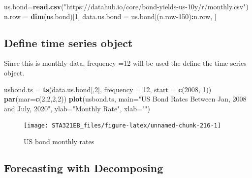 \documentclass[
]{book}
\newenvironment{Shaded}{\begin{snugshade}}{\end{snugshade}}
\newcommand{\AttributeTok}[1]{\textcolor[rgb]{0.13,0.29,0.53}{#1}}
\newcommand{\DecValTok}[1]{\textcolor[rgb]{0.00,0.00,0.81}{#1}}
\newcommand{\FunctionTok}[1]{\textcolor[rgb]{0.13,0.29,0.53}{\textbf{#1}}}
\newcommand{\NormalTok}[1]{#1}
\newcommand{\OtherTok}[1]{\textcolor[rgb]{0.56,0.35,0.01}{#1}}
\newcommand{\SpecialCharTok}[1]{\textcolor[rgb]{0.81,0.36,0.00}{\textbf{#1}}}
\newcommand{\StringTok}[1]{\textcolor[rgb]{0.31,0.60,0.02}{#1}}
\begin{document}
\begin{Shaded}
\begin{Highlighting}[]
\NormalTok{us.bond}\OtherTok{=}\FunctionTok{read.csv}\NormalTok{(}\StringTok{"https://datahub.io/core/bond{-}yields{-}us{-}10y/r/monthly.csv"}\NormalTok{)}
\NormalTok{n.row }\OtherTok{=} \FunctionTok{dim}\NormalTok{(us.bond)[}\DecValTok{1}\NormalTok{]}
\NormalTok{data.us.bond }\OtherTok{=}\NormalTok{ us.bond[(n.row}\DecValTok{{-}150}\NormalTok{)}\SpecialCharTok{:}\NormalTok{n.row, ]}
\end{Highlighting}
\end{Shaded}

\hypertarget{define-time-series-object}{%
\subsection{Define time series object}\label{define-time-series-object}}

Since this is monthly data, frequency =12 will be used the define the time series object.

\begin{Shaded}
\begin{Highlighting}[]
\NormalTok{usbond.ts }\OtherTok{=} \FunctionTok{ts}\NormalTok{(data.us.bond[,}\DecValTok{2}\NormalTok{], }\AttributeTok{frequency =} \DecValTok{12}\NormalTok{, }\AttributeTok{start =} \FunctionTok{c}\NormalTok{(}\DecValTok{2008}\NormalTok{, }\DecValTok{1}\NormalTok{))}
\FunctionTok{par}\NormalTok{(}\AttributeTok{mar=}\FunctionTok{c}\NormalTok{(}\DecValTok{2}\NormalTok{,}\DecValTok{2}\NormalTok{,}\DecValTok{2}\NormalTok{,}\DecValTok{2}\NormalTok{))}
\FunctionTok{plot}\NormalTok{(usbond.ts, }\AttributeTok{main=}\StringTok{"US Bond Rates Between Jan, 2008 and July, 2020"}\NormalTok{, }\AttributeTok{ylab=}\StringTok{"Monthly Rate"}\NormalTok{, }\AttributeTok{xlab=}\StringTok{""}\NormalTok{)}
\end{Highlighting}
\end{Shaded}

\begin{figure}

{\centering \texttt{[image: STA321EB\_files/figure-latex/unnamed-chunk-216-1]} 

}

\caption{US bond monthly rates}\label{fig:unnamed-chunk-216}
\end{figure}

\hypertarget{forecasting-with-decomposing-1}{%
\subsection{Forecasting with Decomposing}\label{forecasting-with-decomposing-1}}
\end{document}
